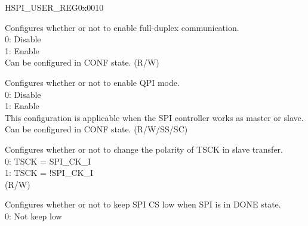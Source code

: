 \begin{register}{H}{SPI\_USER\_REG}{0x0010}\label{regdesc:SPIUSERREG}
%
%
%
%
%
%
%
%
%
%
%
%
%
%
%
%
%
%
%
%
%
%
%
%
%
\regnewline%
\begin{regdesc}\begin{reglist}
\label{fielddesc:SPIDOUTDIN}\item [SPI\_DOUTDIN] Configures whether or not to enable full-duplex communication. \\
0: Disable \\
1: Enable \\
Can be configured in CONF state. (R/W)
\label{fielddesc:SPIQPIMODE}\item [SPI\_QPI\_MODE] Configures whether or not to enable QPI mode. \\
0: Disable \\
1: Enable \\
This configuration is applicable when the SPI controller works as master or slave. Can be configured in CONF state. (R/W/SS/SC)
\label{fielddesc:SPITSCKIEDGE}\item [SPI\_TSCK\_I\_EDGE] Configures whether or not to change the polarity of TSCK in slave transfer. \\
0: TSCK = SPI\_CK\_I \\
1: TSCK = !SPI\_CK\_I \\
(R/W)
\label{fielddesc:SPICSHOLD}\item [SPI\_CS\_HOLD] Configures whether or not to keep SPI CS low when SPI is in DONE state. \\
0: Not keep low \\

\end{reglist}
\end{regdesc}
\end{register}
